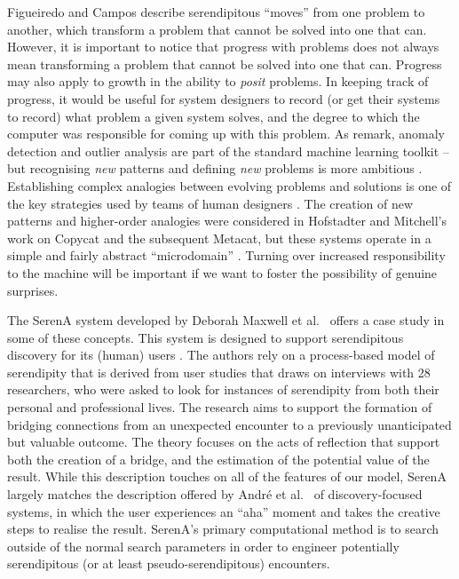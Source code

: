 Figueiredo and Campos \citeyear{Figueiredo2001} describe serendipitous ``moves'' from one
problem to another, which transform a problem that cannot be solved
into one that can.  
However, it is important to notice that progress with problems does not always mean transforming a
problem that cannot be solved into one that can.  Progress may also
apply to growth in the ability to \emph{posit} problems.  In keeping
track of progress, it would be useful for system designers to record
(or get their systems to record) what problem a given system solves,
and the degree to which the computer was responsible for coming up
with this problem.
%
As  remark, anomaly detection and
outlier analysis are part of the standard machine learning toolkit --
but recognising \emph{new} patterns and defining \emph{new} problems
is more ambitious \cite{von2003cybernetics}.  Establishing complex
analogies between evolving problems and solutions is one of the key
strategies used by teams of human designers
\cite{Analogical-problem-evolution-DCC}.  The creation of new patterns
and higher-order analogies were considered in Hofstadter and
Mitchell's work on {\sf Copycat} and the subsequent {\sf Metacat}, but
these systems operate in a simple and fairly abstract ``microdomain''
\cite{hofstadter1994copycat,DBLP:journals/jetai/Marshall06}.
%
Turning over increased responsibility to the machine will be important
if we want to foster the possibility of genuine surprises.

The {\sf SerenA} system developed by Deborah Maxwell et
al.~\citeyear{maxwell2012designing} offers a case study in some
of these concepts.  This system is designed to support
serendipitous discovery for its (human) users
\cite{forth2013serena}.  The authors rely on a process-based
model of serendipity \cite{Makri2012,Makri2012a} that is derived
from user studies that draws on interviews with 28 researchers,
who were asked to look for instances of serendipity from both
their personal and professional lives.  The research aims to
support the formation of bridging connections from an unexpected
encounter to a previously unanticipated but valuable outcome.
The theory focuses on the acts of reflection that support both
the creation of a bridge, and the estimation of the potential
value of the result.
%
While this description touches on all of the features of our model, {\sf
  SerenA} largely matches the description offered by Andr{\'e} et
al.~\citeyear{andre2009discovery} of discovery-focused systems, in which
the user experiences an ``aha'' moment and takes the
creative steps to realise the result.  {\sf SerenA}'s primary computational method is to
search outside of the normal search parameters in order to engineer
potentially serendipitous (or at least pseudo-serendipitous)
encounters.

